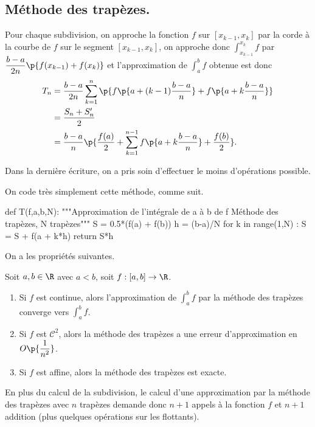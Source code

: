 \subsection{Méthode des trapèzes.}

Pour chaque subdivision, on approche la fonction $f$ sur $[x_{k-1},x_{k}]$ par la corde à la courbe de $f$ sur le segment $[x_{k-1},x_{k}]$, on approche donc $\displaystyle\int_{x_{k-1}}^{x_{k}} f$ par $\dfrac{b-a}{2n}\p{f(x_{k-1}) + f(x_k)}$ et l'approximation de  $\displaystyle\int_a^b f$ obtenue est donc 
\begin{align*}
  T_n &= \dfrac{b-a}{2n} \sum_{k=1}^n \p{f\p{a+(k-1)\dfrac{b-a}{n}} + f\p{a+k\dfrac{b-a}{n}}} \\
      &= \dfrac{S_n + S_n'}{2} \\
      &= \dfrac{b-a}{n}\p{ \dfrac{f(a)}{2} + \sum_{k=1}^{n-1}  f\p{a+k\dfrac{b-a}{n}} + \dfrac{f(b)}{2}}.
\end{align*}

\begin{rem}
  Dans la dernière écriture, on a pris soin d'effectuer le moins d'opérations possible. 
\end{rem}

On code très simplement cette méthode, comme suit. 

\begin{pyverbatim}
def T(f,a,b,N):
    """Approximation de l'intégrale de a à b de f 
    Méthode des trapèzes, N trapèzes"""
    S = 0.5*(f(a) + f(b))
    h = (b-a)/N
    for k in range(1,N) : 
        S = S + f(a + k*h)
    return S*h
\end{pyverbatim}

On a les propriétés suivantes. 

\begin{prop}
  Soit $a,b \in \R$ avec $a<b$, soit $f : [a,b] \to \R$. 
  \begin{enumerate}
    \item Si $f$ est continue, alors l'approximation de $\displaystyle\int_a^b f$ par la méthode des trapèzes converge vers $\displaystyle\int_a^b f$. 
    \item Si $f$ est $\mathscr{C}^2$, alors la méthode des trapèzes a une erreur d'approximation en $O\p{\dfrac{1}{n^2}}$. 
    \item Si $f$ est affine, alors la méthode des trapèzes est exacte. 
  \end{enumerate}
\end{prop}

\begin{rem}
  En plus du calcul de la subdivision, le calcul d'une approximation par la méthode des trapèzes avec $n$ trapèzes demande donc $n+1$ appels à la fonction $f$ et $n+1$ addition (plus quelques opérations sur les flottants).
\end{rem}

